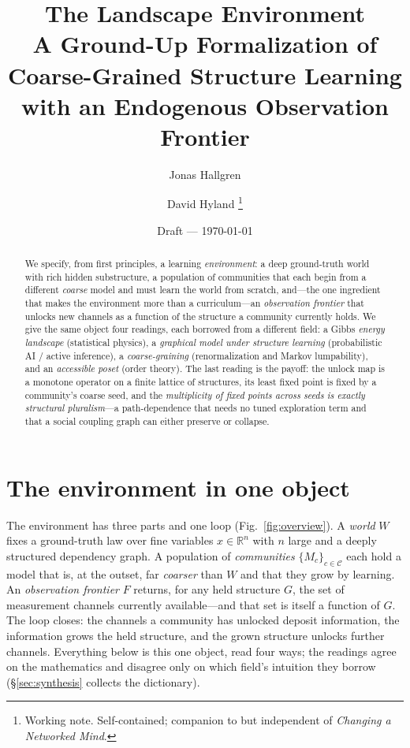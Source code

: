 \documentclass[11pt]{article}
\title{\bfseries The Landscape Environment\\[2pt]
\large A Ground-Up Formalization of Coarse-Grained Structure Learning\\
with an Endogenous Observation Frontier}
\author{Jonas Hallgren \and David Hyland%
\thanks{Working note. Self-contained; companion to but independent of \emph{Changing a Networked Mind}.}}
\date{Draft --- \today}
\newcommand{\R}{\mathbb{R}}
\theoremstyle{definition}
\theoremstyle{plain}
\begin{document}
\maketitle

\begin{abstract}
We specify, from first principles, a learning \emph{environment}: a deep ground-truth world with rich
hidden substructure, a population of communities that each begin from a different \emph{coarse}
model and must learn the world from scratch, and---the one ingredient that makes the environment
more than a curriculum---an \emph{observation frontier} that unlocks new channels as a function of
the structure a community currently holds. We give the same object four readings, each borrowed
from a different field: a Gibbs \emph{energy landscape} (statistical physics), a \emph{graphical
model under structure learning} (probabilistic AI / active inference), a \emph{coarse-graining}
(renormalization and Markov lumpability), and an \emph{accessible poset} (order theory). The last
reading is the payoff: the unlock map is a monotone operator on a finite lattice of structures, its
least fixed point is fixed by a community's coarse seed, and the \emph{multiplicity of fixed points
across seeds is exactly structural pluralism}---a path-dependence that needs no tuned exploration
term and that a social coupling graph can either preserve or collapse.
\end{abstract}

\section{The environment in one object}
\label{sec:overview}

The environment has three parts and one loop (Fig.~\ref{fig:overview}). A \emph{world} $W$ fixes a
ground-truth law over fine variables $x\in\R^{n}$ with $n$ large and a deeply structured dependency
graph. A population of \emph{communities} $\{M_c\}_{c\in\mathcal C}$ each hold a model that is, at
the outset, far \emph{coarser} than $W$ and that they grow by learning. An \emph{observation
frontier} $F$ returns, for any held structure $G$, the set of measurement channels currently
available---and that set is itself a function of $G$. The loop closes: the channels a community has
unlocked deposit information, the information grows the held structure, and the grown structure
unlocks further channels. Everything below is this one object, read four ways; the readings agree on
the mathematics and disagree only on which field's intuition they borrow
(\S\ref{sec:synthesis} collects the dictionary).
\end{document}
